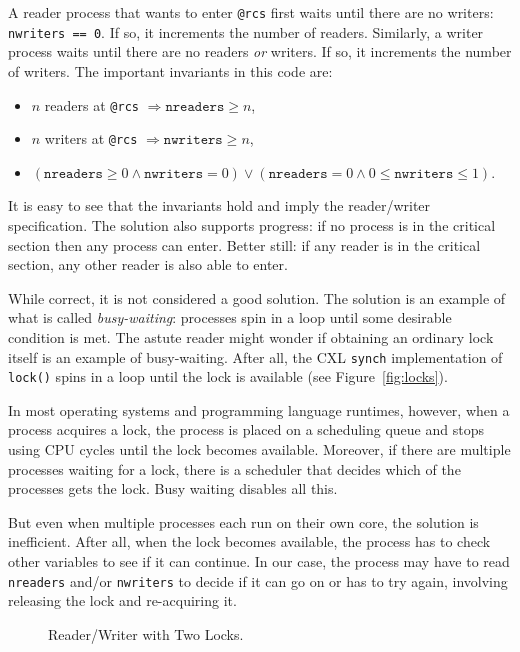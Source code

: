 \documentclass{report}
\newenvironment{code}{
\tcolorbox
}{
\endtcolorbox
}
\begin{document}
A reader process that wants to enter \texttt{@rcs} first waits
until there are no writers: \texttt{nwriters == 0}.
If so, it increments the number of readers.  Similarly, a writer
process waits until there are no readers \emph{or} writers.
If so, it increments the number of writers.
The important invariants in this code are:
\begin{itemize}
\item $n$ readers at \texttt{@rcs} $\Rightarrow \mathtt{nreaders} \ge n$,
\item $n$ writers at \texttt{@rcs} $\Rightarrow \mathtt{nwriters} \ge n$,
\item $(\mathtt{nreaders} \ge 0 \land \mathtt{nwriters} = 0) \lor
    (\mathtt{nreaders} = 0 \land 0 \le \mathtt{nwriters} \le 1)$.
\end{itemize}
It is easy to see that the invariants hold and imply the reader/writer
specification.
The solution also supports progress: if no process is in the critical
section then any process can enter.  Better still: if any reader is in the
critical section, any other reader is also able to enter.

While correct, it is not considered a good solution.
The solution is an example of what is called \emph{busy-waiting}:
processes spin in a loop until some desirable condition is met.
The astute reader might wonder if obtaining an ordinary lock itself is an
example of busy-waiting.  After all, the CXL \texttt{synch} implementation
of \texttt{lock()} spins in a loop until the lock is available
(see Figure~\ref{fig:locks}).

In most operating systems and programming language runtimes, however,
when a process acquires a lock, the process is placed on a scheduling
queue and stops using CPU cycles until the lock becomes available.
Moreover, if there are multiple processes waiting for a lock, there
is a scheduler that decides which of the processes gets the lock.
Busy waiting disables all this.

But even when multiple processes each run on their own core, the solution
is inefficient.  After all, when the lock becomes available, the process
has to check other variables to see if it can continue.  In our case,
the process may have to read \texttt{nreaders} and/or \texttt{nwriters}
to decide if it can go on or has to try again, involving releasing
the lock and re-acquiring it.

\begin{figure}
\begin{code}

\end{code}
\caption{Reader/Writer with Two Locks.}
\label{fig:rw2lock}
\end{figure}
\end{document}
